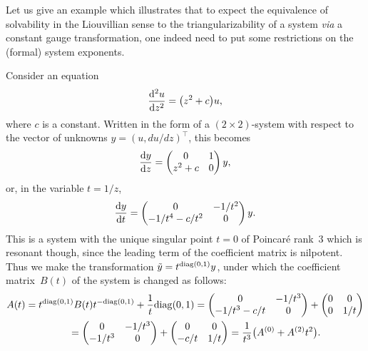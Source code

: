 \begin{Example}\label{example1}Let us give an example which illustrates that to expect the equivalence of solvability in the Liouvillian sense to the triangularizability of a system {\it via} a constant gauge transformation, one indeed need to put some restrictions on the (formal) system exponents.

Consider an equation
\begin{gather*}
\frac{{\rm d}^2u}{{\rm d}z^2}=\big(z^2+c\big)u,
\end{gather*}
where $c$ is a constant. Written in the form of a $(2\times2)$-system with respect to the vector of unknowns $y=(u,du/dz)^{\top}$, this becomes
\begin{gather*}
\frac{{\rm d}y}{{\rm d}z}=\left(\begin{matrix} 0 & 1 \\
 z^2+c & 0
 \end{matrix}\right)y,
\end{gather*}
or, in the variable $t=1/z$,
\begin{gather*}
\frac{{\rm d}y}{{\rm d}t}=\left(\begin{matrix} 0 & -1/t^2 \\
 -1/t^4-c/t^2 & 0
 \end{matrix}\right)y.
\end{gather*}
This is a system with the unique singular point $t=0$ of Poincar\'e rank~$3$ which is resonant though, since the leading term of the coefficient matrix is nilpotent. Thus we make the transformation $\tilde y=t^{{\rm diag}(0,1)}y$, under which the coefficient matrix~$B(t)$ of the system is changed as follows:
\begin{gather*}
A(t)=t^{{\rm diag}(0,1)}B(t) t^{-{\rm diag}(0,1)}+\frac1t {\rm diag}(0,1)=
\left(\begin{matrix} 0 & -1/t^3 \\
-1/t^3-c/t & 0
 \end{matrix}\right)+\left(\begin{matrix} 0 & 0 \\
 0 & 1/t
\end{matrix}\right) \\
\hphantom{A(t)}{} =\left(\begin{matrix} 0 & -1/t^3 \\
 -1/t^3 & 0
\end{matrix}\right)+\left(\begin{matrix} 0 & 0 \\
-c/t & 1/t
\end{matrix}\right)=\frac1{t^3}\big(A^{(0)}+A^{(2)}t^2\big).

\end{gather*}
\end{Example}

